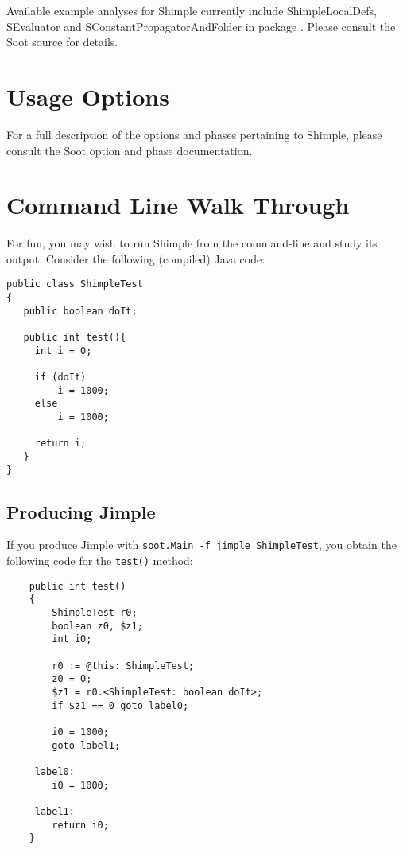 \documentclass[10pt,letterpaper,oneside,onecolumn]{article}
\begin{document}
Available example analyses for Shimple currently include
ShimpleLocalDefs, SEvaluator and SConstantPropagatorAndFolder in
package
.
Please consult the Soot source for details.

\section{Usage Options}

For a full description of the options and phases pertaining to
Shimple, please consult the
Soot option and phase documentation.

\section{Command Line Walk Through}

For fun, you may wish to run Shimple from the command-line and study
its output.  Consider the following (compiled) Java code:

\begin{verbatim}
public class ShimpleTest
{
   public boolean doIt;

   public int test(){
     int i = 0;

     if (doIt)
         i = 1000;
     else
         i = 1000;

     return i;
   }
}
\end{verbatim}

\subsection{Producing Jimple}

If you produce Jimple with 
{\tt soot.Main -f jimple ShimpleTest}, you obtain the following code
for the {\tt test()} method:

\begin{verbatim}
    public int test()
    {
        ShimpleTest r0;
        boolean z0, $z1;
        int i0;

        r0 := @this: ShimpleTest;
        z0 = 0;
        $z1 = r0.<ShimpleTest: boolean doIt>;
        if $z1 == 0 goto label0;

        i0 = 1000;
        goto label1;

     label0:
        i0 = 1000;

     label1:
        return i0;
    }
\end{verbatim}
\end{document}
